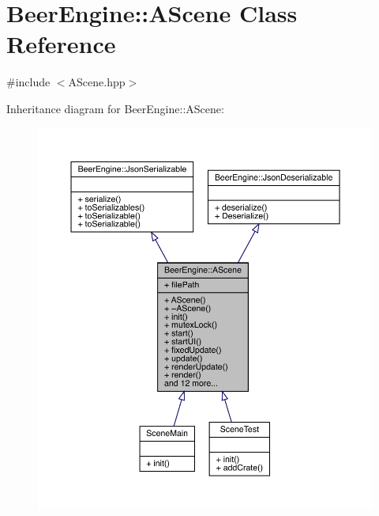 \hypertarget{class_beer_engine_1_1_a_scene}{}\section{Beer\+Engine\+:\+:A\+Scene Class Reference}
\label{class_beer_engine_1_1_a_scene}


{\ttfamily \#include $<$A\+Scene.\+hpp$>$}



Inheritance diagram for Beer\+Engine\+:\+:A\+Scene\+:\nopagebreak
\begin{figure}[H]
\begin{center}
\leavevmode
\includegraphics[width=350pt]{class_beer_engine_1_1_a_scene__inherit__graph}
\end{center}
\end{figure}


